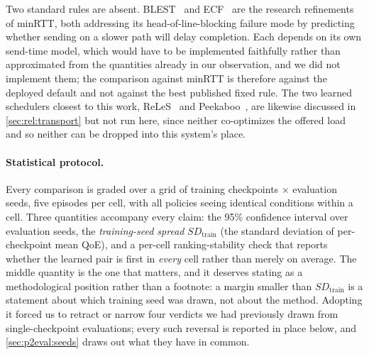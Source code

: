 Two standard rules are absent. BLEST~\cite{Ferlin2016}
and ECF~\cite{Lim2017} are the research refinements of minRTT, both addressing its head-of-line-blocking
failure mode by predicting whether sending on a slower path will delay completion. Each depends on its
own send-time model, which would have to be implemented faithfully rather than approximated from the
quantities already in our observation, and we did not implement them; the comparison against minRTT is
therefore against the deployed default and not against the best published fixed rule. The two learned
schedulers closest to this work, ReLeS~\cite{Zhang2019} and Peekaboo~\cite{Wu2020}, are likewise
discussed in \cref{sec:rel:transport} but not run here, since neither co-optimizes the offered load and
so neither can be dropped into this system's place.

\paragraph{Statistical protocol.} Every comparison is graded over a grid of training checkpoints
$\times$ evaluation seeds, five episodes per cell, with all policies seeing identical conditions within
a cell. Three quantities accompany every claim: the 95\% confidence interval over evaluation seeds, the
\emph{training-seed spread} $\mathit{SD}_{\mathrm{train}}$ (the standard deviation of per-checkpoint
mean QoE), and a per-cell ranking-stability check that reports whether the learned pair is first in
\emph{every} cell rather than merely on average. The middle quantity is the one that matters, and it
deserves stating as a methodological position rather than a footnote: a margin smaller than
$\mathit{SD}_{\mathrm{train}}$ is a statement about which training seed was drawn, not about the method.
Adopting it forced us to retract or narrow four verdicts we had previously drawn from single-checkpoint
evaluations; every such reversal is reported in place below, and \cref{sec:p2eval:seeds} draws out what
they have in common.


